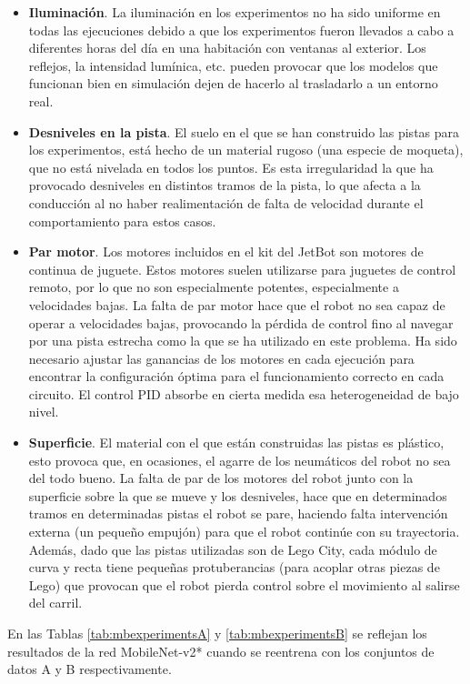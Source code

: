 \begin{itemize}
    \item \textbf{Iluminación}. La iluminación en los experimentos no ha sido uniforme en todas las ejecuciones debido a que los experimentos fueron llevados a cabo a diferentes horas del día en una habitación con ventanas al exterior. Los reflejos, la intensidad lumínica, etc. pueden provocar que los modelos que funcionan bien en simulación dejen de hacerlo al trasladarlo a un entorno real.
    \item \textbf{Desniveles en la pista}. El suelo en el que se han construido las pistas para los experimentos, está hecho de un material rugoso (una especie de moqueta), que no está nivelada en todos los puntos. Es esta irregularidad la que ha provocado desniveles en distintos tramos de la pista, lo que afecta a la conducción al no haber realimentación de falta de velocidad durante el comportamiento para estos casos.
    \item \textbf{Par motor}. Los motores incluidos en el kit del JetBot son motores de continua de juguete. Estos motores suelen utilizarse para juguetes de control remoto, por lo que no son especialmente potentes, especialmente a velocidades bajas. La falta de par motor hace que el robot no sea capaz de operar a velocidades bajas, provocando la pérdida de control fino al navegar por una pista estrecha como la que se ha utilizado en este problema. Ha sido necesario ajustar las ganancias de los motores en cada ejecución para encontrar la configuración óptima para el funcionamiento correcto en cada circuito. El control PID absorbe en cierta medida esa heterogeneidad de bajo nivel. 
    \item \textbf{Superficie}. El material con el que están construidas las pistas es plástico, esto provoca que, en ocasiones, el agarre de los neumáticos del robot no sea del todo bueno. La falta de par de los motores del robot junto con la superficie sobre la que se mueve y los desniveles, hace que en determinados tramos en determinadas pistas el robot se pare, haciendo falta intervención externa (un pequeño empujón) para que el robot continúe con su trayectoria. Además, dado que las pistas utilizadas son de Lego City, cada módulo de curva y recta tiene pequeñas protuberancias (para acoplar otras piezas de Lego) que provocan que el robot pierda control sobre el movimiento al salirse del carril.
\end{itemize}

\noindent En las Tablas \ref{tab:mbexperimentsA} y \ref{tab:mbexperimentsB} se reflejan los resultados de la red MobileNet-v2* cuando se reentrena con los conjuntos de datos A y B respectivamente.

